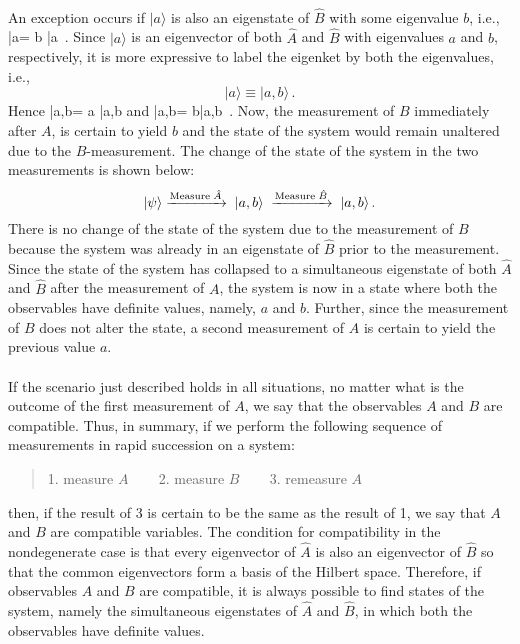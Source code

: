 \paragraph{}
An exception occurs if $|a\rangle$ is also an eigenstate of $\hat{B}$ with some eigenvalue $b$, i.e., 
\be
{}|a\rangle = b |a\rangle \, . 
\ee
Since $|a\rangle$ is an eigenvector of both $\hat{A}$ and $\hat{B}$ with eigenvalues $a$ and $b$, respectively, it is more expressive to label the eigenket by both the eigenvalues, i.e.,
\[ |a\rangle \equiv |a,b\rangle\, . \]
Hence 
\be
{}|a,b\rangle = a |a,b\rangle
\ee
and
\be
{}|a,b\rangle = b|a,b\rangle\, .
\ee
Now, the measurement of $B$ immediately after $A$, is certain to yield $b$ and the state of the system would remain unaltered due to the $B$-measurement. The change of the state of the system in the two measurements is shown below:
\[ |\psi\rangle \xrightarrow{{\rm Measure} \; \hat{A}}\; |a,b\rangle\; \xrightarrow{{\rm Measure} \; \hat{B}}\; |a,b\rangle \, . \]
There is no change of the state of the system due to the measurement of $B$ because the system was already in an eigenstate of 
$\hat{B}$
prior to the measurement. Since the state of the system has collapsed to a simultaneous eigenstate of both $\hat{A}$ and
$\hat{B}$ after the measurement of $A$, the system is now in a state where both the observables have definite values, namely, $a$ 
and $b$. Further, since the measurement of $B$ does not alter the state, a second measurement of $A$ is certain to yield the previous value $a$. 

\paragraph{}
If the scenario just described holds in all situations, no matter what is the outcome of the first measurement of $A$, we say that the observables $A$ and $B$ are compatible. Thus, in summary, if we perform the following sequence of measurements in rapid succession on a system:
\begin{quote}
1. measure $A$ ~~~ 2. measure $B$ ~~~ 3. remeasure $A$
\end{quote}
then, if the result of 3 is certain to be the same as the result of 1, we say that $A$ and $B$ are compatible variables. The condition for compatibility in the nondegenerate case is that every eigenvector of $\hat{A}$ is also an eigenvector of $\hat{B}$
so that the common eigenvectors form a basis of the Hilbert space. Therefore, if observables $A$ and $B$ are compatible, it is always possible to find states of the system, namely the simultaneous eigenstates of $\hat{A}$ and $\hat{B}$, in which both the observables
have definite values.


